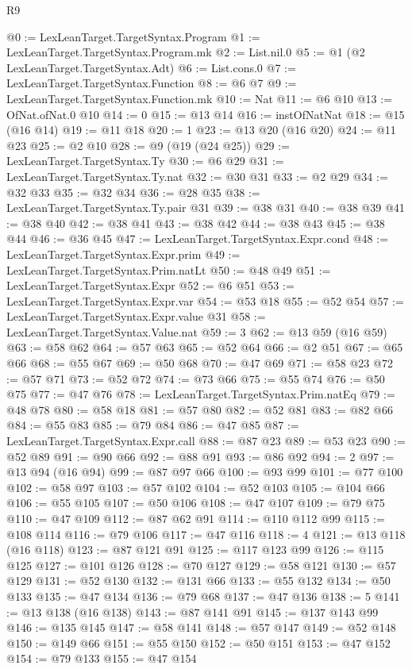 \begin{lexlean}{R9}
\begin{coremodule}
@0 := LexLeanTarget.TargetSyntax.Program
@1 := LexLeanTarget.TargetSyntax.Program.mk
@2 := List.nil.{0}
@5 := @1 (@2 LexLeanTarget.TargetSyntax.Adt)
@6 := List.cons.{0}
@7 := LexLeanTarget.TargetSyntax.Function
@8 := @6 @7
@9 := LexLeanTarget.TargetSyntax.Function.mk
@10 := Nat
@11 := @6 @10
@13 := OfNat.ofNat.{0} @10
@14 := 0
@15 := @13 @14
@16 := instOfNatNat
@18 := @15 (@16 @14)
@19 := @11 @18
@20 := 1
@23 := @13 @20 (@16 @20)
@24 := @11 @23
@25 := @2 @10
@28 := @9 (@19 (@24 @25))
@29 := LexLeanTarget.TargetSyntax.Ty
@30 := @6 @29
@31 := LexLeanTarget.TargetSyntax.Ty.nat
@32 := @30 @31
@33 := @2 @29
@34 := @32 @33
@35 := @32 @34
@36 := @28 @35
@38 := LexLeanTarget.TargetSyntax.Ty.pair @31
@39 := @38 @31
@40 := @38 @39
@41 := @38 @40
@42 := @38 @41
@43 := @38 @42
@44 := @38 @43
@45 := @38 @44
@46 := @36 @45
@47 := LexLeanTarget.TargetSyntax.Expr.cond
@48 := LexLeanTarget.TargetSyntax.Expr.prim
@49 := LexLeanTarget.TargetSyntax.Prim.natLt
@50 := @48 @49
@51 := LexLeanTarget.TargetSyntax.Expr
@52 := @6 @51
@53 := LexLeanTarget.TargetSyntax.Expr.var
@54 := @53 @18
@55 := @52 @54
@57 := LexLeanTarget.TargetSyntax.Expr.value @31
@58 := LexLeanTarget.TargetSyntax.Value.nat
@59 := 3
@62 := @13 @59 (@16 @59)
@63 := @58 @62
@64 := @57 @63
@65 := @52 @64
@66 := @2 @51
@67 := @65 @66
@68 := @55 @67
@69 := @50 @68
@70 := @47 @69
@71 := @58 @23
@72 := @57 @71
@73 := @52 @72
@74 := @73 @66
@75 := @55 @74
@76 := @50 @75
@77 := @47 @76
@78 := LexLeanTarget.TargetSyntax.Prim.natEq
@79 := @48 @78
@80 := @58 @18
@81 := @57 @80
@82 := @52 @81
@83 := @82 @66
@84 := @55 @83
@85 := @79 @84
@86 := @47 @85
@87 := LexLeanTarget.TargetSyntax.Expr.call
@88 := @87 @23
@89 := @53 @23
@90 := @52 @89
@91 := @90 @66
@92 := @88 @91
@93 := @86 @92
@94 := 2
@97 := @13 @94 (@16 @94)
@99 := @87 @97 @66
@100 := @93 @99
@101 := @77 @100
@102 := @58 @97
@103 := @57 @102
@104 := @52 @103
@105 := @104 @66
@106 := @55 @105
@107 := @50 @106
@108 := @47 @107
@109 := @79 @75
@110 := @47 @109
@112 := @87 @62 @91
@114 := @110 @112 @99
@115 := @108 @114
@116 := @79 @106
@117 := @47 @116
@118 := 4
@121 := @13 @118 (@16 @118)
@123 := @87 @121 @91
@125 := @117 @123 @99
@126 := @115 @125
@127 := @101 @126
@128 := @70 @127
@129 := @58 @121
@130 := @57 @129
@131 := @52 @130
@132 := @131 @66
@133 := @55 @132
@134 := @50 @133
@135 := @47 @134
@136 := @79 @68
@137 := @47 @136
@138 := 5
@141 := @13 @138 (@16 @138)
@143 := @87 @141 @91
@145 := @137 @143 @99
@146 := @135 @145
@147 := @58 @141
@148 := @57 @147
@149 := @52 @148
@150 := @149 @66
@151 := @55 @150
@152 := @50 @151
@153 := @47 @152
@154 := @79 @133
@155 := @47 @154

\end{coremodule}
\end{lexlean}
